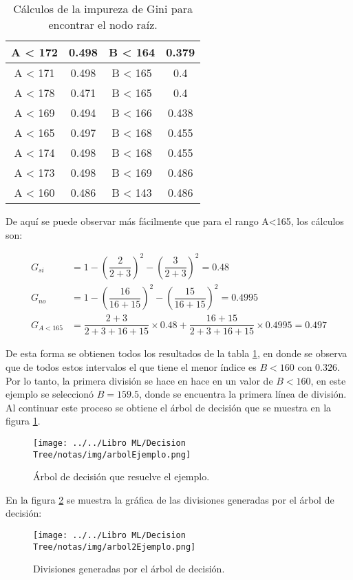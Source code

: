 \documentclass[
10pt, %
a4paper, %
]{article}
\begin{document}
\begin{table}[H]
\begin{tabular}{c|c|c|c}
		A < 172 & 0.498	& B < 164 &	0.379\\\midrule
		A < 171 & 0.498	& B < 165 &	0.4\\\midrule
		A < 178 & 0.471 & B < 165 &	0.4\\\midrule
		A < 169 & 0.494	& B < 166 &	0.438\\\midrule
		A < 165 & 0.497	& B < 168 &	0.455\\\midrule
		A < 174 & 0.498	& B < 168 &	0.455\\\midrule
		A < 173 & 0.498	& B < 169 &	0.486\\\midrule
		A < 160 & 0.486	& B < 143 &	0.486\\	
		\bottomrule
	\end{tabular}
	\caption{Cálculos de la impureza de Gini para encontrar el nodo raíz.}
	\label{table:datosEjemplo2}
\end{table}

De aquí se puede observar más fácilmente que para el rango A<165, los cálculos son:

\begin{align*}
	G_{si} &= 1 - \left(\dfrac{2}{2+3}\right)^2 - \left(\dfrac{3}{2+3}\right)^2 = 0.48\\
	G_{no} &= 1 - \left(\dfrac{16}{16+15}\right)^2 - \left(\dfrac{15}{16+15}\right)^2 = 0.4995\\
	G_{A<165} &= \dfrac{2+3}{2+3+16+15}\times 0.48 + \dfrac{16+15}{2+3+16+15}\times 0.4995 = 0.497
\end{align*}

De esta forma se obtienen todos los resultados de la tabla \ref{table:datosEjemplo2}, en donde se observa que de todos estos intervalos el que tiene el menor índice 
es $B<160$ con $0.326$. Por lo tanto, la primera división se hace en hace en un valor de $B<160$, en este ejemplo se seleccionó $B=159.5$, donde se encuentra la primera 
línea de división. Al continuar este proceso se obtiene el árbol de decisión que se muestra en la figura \ref{fig:arbolEjemplo}.

\begin{figure}[H]
	\centering
	\texttt{[image: ../../Libro ML/Decision Tree/notas/img/arbolEjemplo.png]}
	\caption{Árbol de decisión que resuelve el ejemplo.}
	\label{fig:arbolEjemplo}
\end{figure}

En la figura \ref{fig:arbol2Ejemplo} se muestra la gráfica de las divisiones generadas por el árbol de decisión:

\begin{figure}[H]
	\centering
	\texttt{[image: ../../Libro ML/Decision Tree/notas/img/arbol2Ejemplo.png]}
	\caption{Divisiones generadas por el árbol de decisión.}
	\label{fig:arbol2Ejemplo}
\end{figure}
\end{document}
